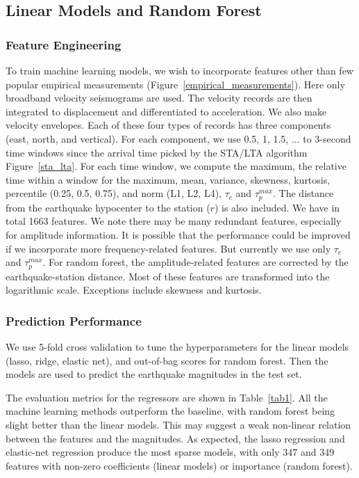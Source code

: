 \documentclass{article} %
\begin{document}
\subsection{Linear Models and Random Forest}
\subsubsection{Feature Engineering}
To train machine learning models, we wish to incorporate features other than few popular empirical measurements (Figure~\ref{empirical_measurements}). Here only broadband velocity seismograms are used. The velocity records are then integrated to displacement and differentiated to acceleration. We also make velocity envelopes. Each of these four types of records has three components (east, north, and vertical). For each component, we use 0.5, 1, 1.5, ... to 3-second time windows since the arrival time picked by the STA/LTA algorithm Figure~\ref{sta_lta}. For each time window, we compute the maximum, the relative time within a window for the maximum, mean, variance, skewness, kurtosis, percentile (0.25, 0.5, 0.75), and norm (L1, L2, L4), $\tau_c$ and $\tau_p^{max}$. The distance from the earthquake hypocenter to the station ($r$) is also included. We have in total 1663 features. We note there may be many redundant features, especially for amplitude information. It is possible that the performance could be improved if we incorporate more frequency-related features. But currently we use only $\tau_c$ and $\tau_p^{max}$. For random forest, the amplitude-related features are corrected by the earthquake-station distance. Most of these features are transformed into the logarithmic scale. Exceptions include skewness and kurtosis. 
\subsubsection{Prediction Performance}
We use 5-fold cross validation to tune the hyperparameters for the linear models (lasso, ridge, elastic net), and out-of-bag scores for random forest. Then the models are used to predict the earthquake magnitudes in the test set.

The evaluation metrics for the regressors are shown in Table~\ref{tab1}. All the machine learning methods outperform the baseline, with random forest being slight better than the linear models. This may suggest a weak non-linear relation between the features and the magnitudes. As expected, the lasso regression and elastic-net regression produce the most sparse models, with only 347 and 349 features with non-zero coefficients (linear models) or importance (random forest).   
\end{document}
